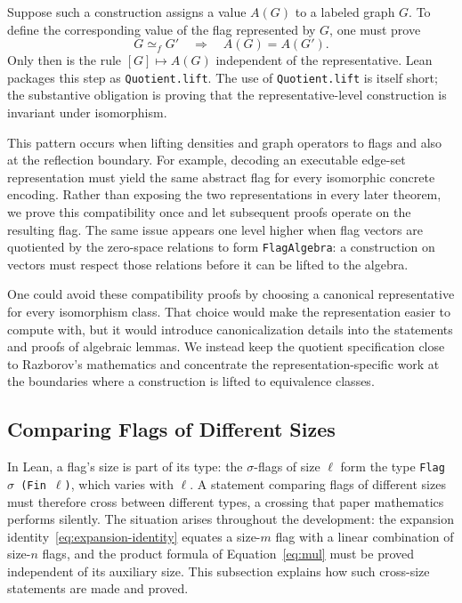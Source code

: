 \documentclass{article}
\newcommand{\lean}[1]{\texttt{#1}}
\begin{document}
Suppose such a construction assigns a value $A(G)$ to a labeled graph $G$.
To define the corresponding value of the flag represented by $G$, one must
prove
\[
  G \simeq_f G' \quad\Longrightarrow\quad A(G)=A(G').
\]
Only then is the rule $[G]\mapsto A(G)$ independent of the representative.
Lean packages this step as \lean{Quotient.lift}.  The use of
\lean{Quotient.lift} is itself short; the substantive obligation is proving
that the representative-level construction is invariant under isomorphism.

This pattern occurs when lifting densities and graph operators to flags and
also at the reflection boundary.  For example, decoding an executable
edge-set representation must yield the same abstract flag for every
isomorphic concrete encoding.  Rather than exposing the two representations in
every later theorem, we prove this compatibility once and let subsequent
proofs operate on the resulting flag.  The same issue appears one level higher
when flag vectors are quotiented by the zero-space relations to form
\lean{FlagAlgebra}: a construction on vectors must respect those relations
before it can be lifted to the algebra.

One could avoid these compatibility proofs by choosing a canonical
representative for every isomorphism class.  That choice would make the
representation easier to compute with, but it would introduce
canonicalization details into the statements and proofs of algebraic lemmas.
We instead keep the quotient specification close to Razborov's mathematics
and concentrate the representation-specific work at the boundaries where a
construction is lifted to equivalence classes.

\subsection{Comparing Flags of Different Sizes}

In Lean, a flag's size is part of its type: the $\sigma$-flags of size $\ell$
form the type \lean{Flag $\sigma$ (Fin $\ell$)}, which varies with $\ell$.  A
statement comparing flags of different sizes must therefore cross between
different types, a crossing that paper mathematics performs silently.  The
situation arises throughout the development: the expansion
identity~\eqref{eq:expansion-identity} equates a size-$m$ flag with a
linear combination of size-$n$ flags, and the product formula of
Equation~\eqref{eq:mul} must be proved independent of its auxiliary size.
This subsection explains how such cross-size statements are made and proved.
\end{document}
